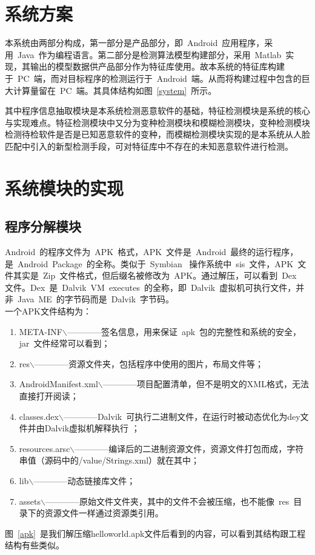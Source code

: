 \section{系统方案}
	 本系统由两部分构成，第一部分是产品部分，即~Android~应用程序，采用~Java~作为编程语言。第二部分是检测算法模型构建部分，采用~Matlab~实现，其输出的模型数据供产品部分作为特征库使用。故本系统的特征库构建于~PC~端，而对目标程序的检测运行于~Android~端。从而将构建过程中包含的巨大计算量留在~PC~端。其具体结构如图~\ref{system}~所示。

	 其中程序信息抽取模块是本系统检测恶意软件的基础，特征检测模块是系统的核心与实现难点。特征检测模块中又分为变种检测模块和模糊检测模块，变种检测模块检测待检软件是否是已知恶意软件的变种，而模糊检测模块实现的是本系统从人脸匹配中引入的新型检测手段，可对特征库中不存在的未知恶意软件进行检测。
	
\section{系统模块的实现}
	\subsection{程序分解模块}
		
		 Android~的程序文件为~APK~格式，APK~文件是~Android~最终的运行程序，是~Android~Package~的全称。类似于~Symbian~ 操作系统中~sis~文件，APK~文件其实是~Zip~文件格式，但后缀名被修改为~APK。通过解压，可以看到~Dex~ 文件。Dex~是~Dalvik~VM~executes~的全称，即~Dalvik~虚拟机可执行文件，并非~Java~ME~的字节码而是~Dalvik~字节码。\\
		一个APK文件结构为：
		\begin{enumerate}
		\item META-INF$\backslash$————签名信息，用来保证~apk~包的完整性和系统的安全，jar~文件经常可以看到；
		\item res$\backslash$————资源文件夹，包括程序中使用的图片，布局文件等；
		\item AndroidManifest.xml$\backslash$————项目配置清单，但不是明文的XML格式，无法直接打开阅读；
		\item classes.dex$\backslash$————Dalvik~可执行二进制文件，在运行时被动态优化为dey文件并由Dalvik虚拟机解释执行	 ；
		\item resources.arsc$\backslash$————编译后的二进制资源文件，资源文件打包而成，字符串值（源码中的/value/Strings.xml）就在其中；
		\item lib$\backslash$————动态链接库文件；
		\item assets$\backslash$————原始文件文件夹，其中的文件不会被压缩，也不能像~res~目录下的资源文件一样通过资源类引用。
		\end{enumerate}\par
		 图~\ref{apk}~是我们解压缩helloworld.apk文件后看到的内容，可以看到其结构跟工程结构有些类似。
		
